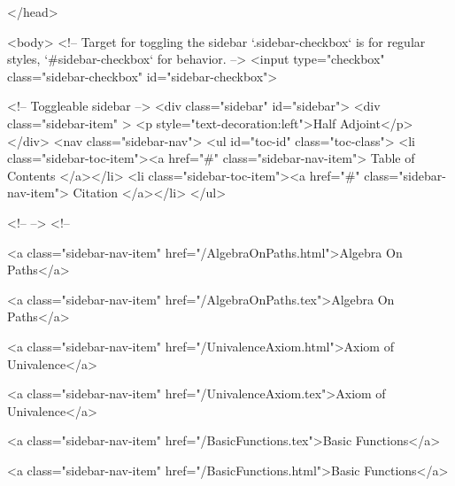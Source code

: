   
</head>




  <body>
    <!-- Target for toggling the sidebar `.sidebar-checkbox` is for regular
     styles, `#sidebar-checkbox` for behavior. -->
<input type="checkbox" class="sidebar-checkbox" id="sidebar-checkbox">

<!-- Toggleable sidebar -->
<div class="sidebar" id="sidebar">
  <div class="sidebar-item" >
    <p style="text-decoration:left">Half Adjoint</p>
  </div>
  <nav class="sidebar-nav">
    <ul id="toc-id" class="toc-class">
  <li class="sidebar-toc-item"><a href="#" class="sidebar-nav-item"> Table of Contents </a></li>
  <li class="sidebar-toc-item"><a href="#" class="sidebar-nav-item"> Citation </a></li>
</ul>


    <!--  -->
    <!-- 
      
    
      
    
      
    
      
        
      
    
      
        
          <a class="sidebar-nav-item" href="/AlgebraOnPaths.html">Algebra On Paths</a>
        
      
    
      
        
          <a class="sidebar-nav-item" href="/AlgebraOnPaths.tex">Algebra On Paths</a>
        
      
    
      
        
          <a class="sidebar-nav-item" href="/UnivalenceAxiom.html">Axiom of Univalence</a>
        
      
    
      
        
          <a class="sidebar-nav-item" href="/UnivalenceAxiom.tex">Axiom of Univalence</a>
        
      
    
      
        
          <a class="sidebar-nav-item" href="/BasicFunctions.tex">Basic Functions</a>
        
      
    
      
        
          <a class="sidebar-nav-item" href="/BasicFunctions.html">Basic Functions</a>
        
      
    
      
        
